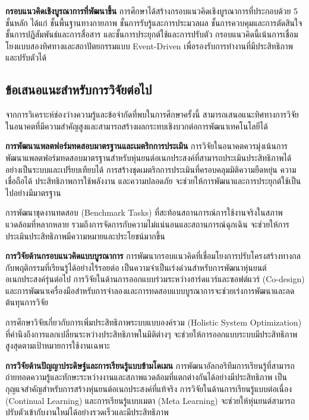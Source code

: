 \documentclass[a4paper]{article}
\begin{document}
\textbf{กรอบแนวคิดเชิงบูรณาการที่พัฒนาขึ้น} การศึกษาได้สร้างกรอบแนวคิดเชิงบูรณาการที่ประกอบด้วย 5 ชั้นหลัก ได้แก่ ชั้นพื้นฐานทางกายภาพ ชั้นการรับรู้และการประมวลผล ชั้นการควบคุมและการตัดสินใจ ชั้นการปฏิสัมพันธ์และการสื่อสาร และชั้นการประยุกต์ใช้และการปรับตัว กรอบแนวคิดนี้เน้นการเชื่อมโยงแบบสองทิศทางและสถาปัตยกรรมแบบ Event-Driven เพื่อรองรับการทำงานที่มีประสิทธิภาพและปรับตัวได้

\subsection{ข้อเสนอแนะสำหรับการวิจัยต่อไป}

จากการวิเคราะห์ช่องว่างความรู้และข้อจำกัดที่พบในการศึกษาครั้งนี้ สามารถเสนอแนะทิศทางการวิจัยในอนาคตที่มีความสำคัญสูงและสามารถสร้างผลกระทบเชิงบวกต่อการพัฒนาเทคโนโลยีได้

\textbf{การพัฒนาแพลตฟอร์มทดสอบมาตรฐานและเมตริกการประเมิน} การวิจัยในอนาคตควรมุ่งเน้นการพัฒนาแพลตฟอร์มทดสอบมาตรฐานสำหรับหุ่นยนต์อเนกประสงค์ที่สามารถประเมินประสิทธิภาพได้อย่างเป็นระบบและเปรียบเทียบได้ การสร้างชุดเมตริกการประเมินที่ครอบคลุมมิติความยืดหยุ่น ความเชื่อถือได้ ประสิทธิภาพการใช้พลังงาน และความปลอดภัย จะช่วยให้การพัฒนาและการประยุกต์ใช้เป็นไปอย่างมีมาตรฐาน

การพัฒนาชุดงานทดสอบ (Benchmark Tasks) ที่สะท้อนสถานการณ์การใช้งานจริงในสภาพแวดล้อมที่หลากหลาย รวมถึงการจัดการกับความไม่แน่นอนและสถานการณ์ฉุกเฉิน จะช่วยให้การประเมินประสิทธิภาพมีความหมายและประโยชน์มากขึ้น

\textbf{การวิจัยด้านกรอบแนวคิดแบบบูรณาการ} การพัฒนากรอบแนวคิดที่เชื่อมโยงการปรับโครงสร้างทางกลกับพฤติกรรมที่เรียนรู้ได้อย่างไร้รอยต่อ เป็นความจำเป็นเร่งด่วนสำหรับการพัฒนาหุ่นยนต์อเนกประสงค์รุ่นต่อไป การวิจัยในด้านการออกแบบร่วมระหว่างฮาร์ดแวร์และซอฟต์แวร์ (Co-design) และการพัฒนาเครื่องมือสำหรับการจำลองและการทดสอบแบบบูรณาการจะช่วยเร่งการพัฒนาและลดต้นทุนการวิจัย

การศึกษาวิจัยเกี่ยวกับการเพิ่มประสิทธิภาพระบบแบบองค์รวม (Holistic System Optimization) ที่คำนึงถึงการแลกเปลี่ยนระหว่างประสิทธิภาพในมิติต่างๆ จะช่วยให้การออกแบบระบบมีประสิทธิภาพสูงสุดตามเป้าหมายการใช้งานเฉพาะ

\textbf{การวิจัยด้านปัญญาประดิษฐ์และการเรียนรู้แบบข้ามโดเมน} การพัฒนาอัลกอริทึมการเรียนรู้ที่สามารถถ่ายทอดความรู้และทักษะระหว่างงานและสภาพแวดล้อมที่แตกต่างกันได้อย่างมีประสิทธิภาพ เป็นกุญแจสำคัญสำหรับการสร้างหุ่นยนต์อเนกประสงค์ที่แท้จริง การวิจัยในด้านการเรียนรู้แบบต่อเนื่อง (Continual Learning) และการเรียนรู้แบบเมตา (Meta Learning) จะช่วยให้หุ่นยนต์สามารถปรับตัวเข้ากับงานใหม่ได้อย่างรวดเร็วและมีประสิทธิภาพ
\end{document}
